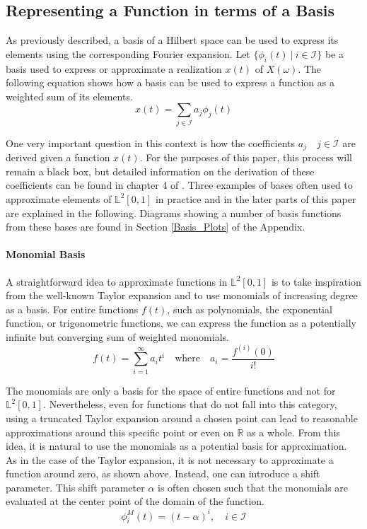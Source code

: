 \documentclass[11pt,twoside,a4paper]{article}
\begin{document}
	\subsection{Representing a Function in terms of a Basis}\label{bases}
	As previously described, a basis of a Hilbert space can be used to express its elements using the corresponding Fourier expansion. Let $\{\phi_i(t) \: \vert \: i \in \mathcal{I}\}$ be a basis used to express or approximate a realization $x(t)$ of $X(\omega)$. The following equation shows how a basis can be used to express a function as a weighted sum of its elements.
	\begin{equation}
		x(t) = \sum_{j \in \mathcal{I}} a_j \phi_j(t) 
	\end{equation}
	
	One very important question in this context is how the coefficients $a_j \quad j \in \mathcal{I}$ are derived given a function $x(t)$. For the purposes of this paper, this process will remain a black box, but detailed information on the derivation of these coefficients can be found in chapter 4 of \cite{ramsay_functional_2005}.
	Three examples of bases often used to approximate elements of $\mathbb{L}^2[0,1]$ in practice and in the later parts of this paper are explained in the following. Diagrams showing a number of basis functions from these bases are found in Section \ref{Basis_Plots} of the Appendix.
	\vspace{-0.2cm}
	
	\paragraph{Monomial Basis}\label{Monomial_basis}
	A straightforward idea to approximate functions in $\mathbb{L}^2[0,1]$ is to take inspiration from the well-known Taylor expansion and to use monomials of increasing degree as a basis. For entire functions $f(t)$, such as polynomials, the exponential function, or trigonometric functions, we can express the function as a potentially infinite but converging sum of weighted monomials.
	\begin{equation}\label{Taylor_expansion}
		f(t) = \sum_{i = 1}^{\infty}a_i t^i \quad \text{where} \quad a_i = \frac{f^{(i)}(0)}{i!}
	\end{equation}
	
	The monomials are only a basis for the space of entire functions and not for $\mathbb{L}^2[0,1]$. Nevertheless, even for functions that do not fall into this category, using a truncated Taylor expansion around a chosen point can lead to reasonable approximations around this specific point or even on $\mathbb{R}$ as a whole. From this idea, it is natural to use the monomials as a potential basis for approximation. \\
	As in the case of the Taylor expansion, it is not necessary to approximate a function around zero, as shown above. Instead, one can introduce a shift parameter. This shift parameter $\alpha$ is often chosen such that the monomials are evaluated at the center point of the domain of the function.
	\begin{equation}
		\phi_{i}^{M}(t) = (t-\alpha)^i, \quad i \in \mathcal{I}
	\end{equation}
\end{document}
